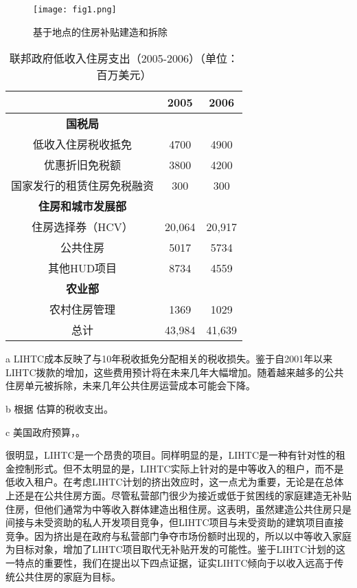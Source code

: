 \documentclass[lang=cn,11pt,a4paper]{paper}
\begin{document}
\begin{figure}[h]
	\centering
	\texttt{[image: fig1.png]}
	\caption{基于地点的住房补贴建造和拆除}\label{fig1}
\end{figure}

\renewcommand\arraystretch{0.9}
\begin{table}[h]
  \centering
  \setlength{\tabcolsep}{12mm}
    \begin{threeparttable}
    \caption{联邦政府低收入住房支出（2005-2006）（单位：百万美元）\!\!}\label{tab2}
      \begin{tabular}{ccc}
        \toprule
        & 2005 & 2006 \\
        \midrule
        \textbf{国税局}\tnote{b} & & \\
        低收入住房税收抵免 & 4700 & 4900 \\
        优惠折旧免税额 & 3800 & 4200 \\
        国家发行的租赁住房免税融资 & 300 &
        300 \\[5pt]
        \textbf{住房和城市发展部}\tnote{c} & & \\
        住房选择券（HCV） & 20,064 & 20,917 \\
        公共住房 & 5017 & 5734 \\
        其他HUD项目 & 8734 & 4559 \\[5pt]
        \textbf{农业部}\tnote{c} & & \\
        农村住房管理 & 1369 & 1029 \\
        总计 & 43,984 & 41,639 \\
        \bottomrule
      \end{tabular}
    \begin{tablenotes}
      \footnotesize
      \item[a] LIHTC成本反映了与10年税收抵免分配相关的税收损失。鉴于自2001年以来LIHTC拨款的增加，这些费用预计将在未来几年大幅增加。随着越来越多的公共住房单元被拆除，未来几年公共住房运营成本可能会下降。
      \item[b] 根据 \cite{USCongress2005} 估算的税收支出。
      \item[c] 美国政府预算，\cite{Budget2006}。
    \end{tablenotes}
  \end{threeparttable}
  \end{table}

很明显，LIHTC是一个昂贵的项目。同样明显的是，LIHTC是一种有针对性的租金控制形式。但不太明显的是，LIHTC实际上针对的是中等收入的租户，而不是低收入租户。在考虑LIHTC计划的挤出效应时，这一点尤为重要，无论是在总体上还是在公共住房方面。尽管私营部门很少为接近或低于贫困线的家庭建造无补贴住房，但他们通常为中等收入群体建造出租住房。这表明，虽然建造公共住房只是间接与未受资助的私人开发项目竞争，但LIHTC项目与未受资助的建筑项目直接竞争。因为挤出是在政府与私营部门争夺市场份额时出现的，所以以中等收入家庭为目标对象，增加了LIHTC项目取代无补贴开发的可能性。鉴于LIHTC计划的这一特点的重要性，我们在提出以下四点证据，证实LIHTC倾向于以收入远高于传统公共住房的家庭为目标。
\end{document}

